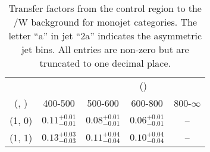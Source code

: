 \begin{table}[h!]
\tiny
\centering
\caption{Transfer factors from the \gj control region to the \ttbar/W background for monojet categories. The letter ``a'' in jet \eg ``2a''  indicates the asymmetric jet bins. All entries are non-zero but are truncated to one decimal place.\label{tab:tf_gj_ttw_mono}}
\begin{tabular}
{ccccc}
	\hline\hline
&	& \multicolumn{4}{c}{\scalht (\gev)} \\ 
	 (\njet,  \nb) & 400-500 & 500-600 & 600-800 & 800-$\infty$ \\ [0.8ex] 
\hline
	(1, 0) & $0.11^{+ 0.01 }_{- 0.01 }$ & $0.08^{+ 0.01 }_{- 0.01 }$ & $0.06^{+ 0.01 }_{- 0.01 }$ & -- \\[0.5ex] 
	(1, 1) & $0.13^{+ 0.03 }_{- 0.03 }$ & $0.11^{+ 0.04 }_{- 0.04 }$ & $0.10^{+ 0.04 }_{- 0.04 }$ & -- \\[0.5ex] 
	\hline
	\hline
\end{tabular}
\end{table}
